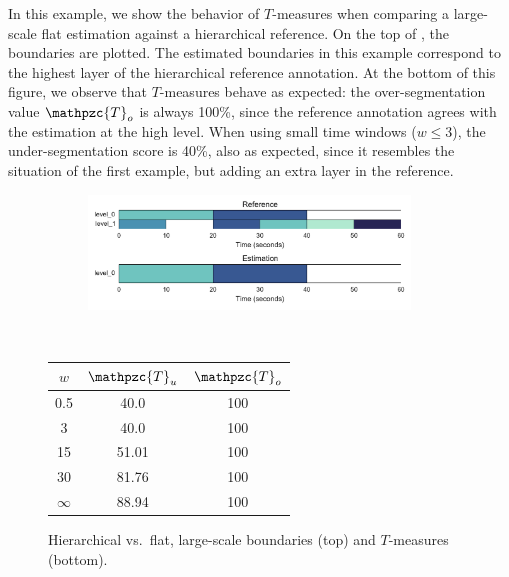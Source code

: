\documentclass{article}
\def\shag{\ensuremath{\mathpzc{T}}}
\begin{document}
In this example, we show the behavior of $T$-measures when comparing a large-scale flat estimation against a hierarchical reference.
On the top of , the boundaries are plotted.
The estimated boundaries in this example correspond to the highest layer of the hierarchical reference annotation.
At the bottom of this figure, we observe that $T$-measures behave as expected: the over-segmentation value $\shag_o$ is always 100\%, since the reference annotation agrees with the estimation at the high level.
When using small time windows ($w \leq 3$), the under-segmentation score is 40\%, also as expected, since it resembles the situation of the first example, but adding an extra layer in the reference.


\begin{figure}
  \centering
  \begin{subfigure}{0.5\textwidth}
    \centering
    \includegraphics[width=0.94\textwidth]{figs/hier-flatlarge.pdf}
  \end{subfigure}%
  \\
  \begin{minipage}{0.5\textwidth}
    \centering
    \vspace{10pt}
    \begin{tabular}{|c|c|c|}
      \hline
      $w$       & $\shag_u$    & $\shag_o$      \\
      \hline
      0.5       & 40.0      & 100      \\     
      3         & 40.0      & 100      \\
      15        & 51.01     & 100    \\
      30        & 81.76     & 100    \\
      $\infty$  & 88.94     & 100    \\
      \hline
    \end{tabular}
  \end{minipage}
  \caption{Hierarchical vs.\ flat, large-scale boundaries (top) and $T$-measures (bottom).}
  \label{fig:hier-flatlarge}
\end{figure}
\end{document}
